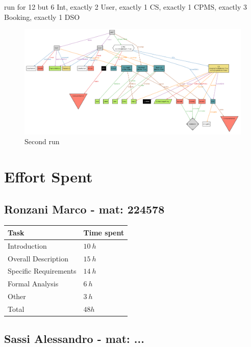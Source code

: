 \documentclass[11pt]{article}
\begin{document}
\begin{ffcode}
run {} for 12 but 6 Int, exactly 2 User, exactly 1 CS, exactly 1 CPMS, exactly 3 Booking, exactly 1 DSO
\end{ffcode}

\begin{figure}[!ht]
    \centering
    \includegraphics[width=190mm]{Alloy_1.png}
    \caption{Second run}
    \label{fig:my_label}
\end{figure}

\newpage

\section{Effort Spent}
\label{section:effort}

\subsection{Ronzani Marco - mat: 224578}

\begin{tabular}{|l|l|}
    \hline
    \textbf{Task} & \textbf{Time spent} \\
    \hline
    Introduction & $10\ h$ \\
    \hline
    Overall Description & $15\ h$ \\
    \hline
    Specific Requirements & $14\ h$ \\
    \hline
    Formal Analysis & $6\ h$ \\
    \hline
    Other & $3\ h$ \\
    \hline
    \hline
    Total & $48 h$ \\
    \hline
\end{tabular}

\subsection{Sassi Alessandro - mat: ...}
\end{document}
